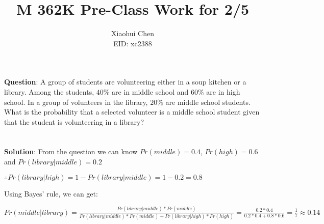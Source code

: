 \documentclass[12pt]{article}
\author{Xiaohui Chen \\EID: xc2388}
\title{M 362K Pre-Class Work for 2/5}
\begin{document}
\maketitle
\begin{spacing}{2.0}

\textbf{Question}: A group of students are volunteering either in a soup kitchen or a library. Among the students, $40\%$ are in middle school and $60\%$ are in high school. In a group of volunteers in the library, $20\%$ are middle school students. What is the probability that a selected volunteer is a middle school student given that the student is volunteering in a library?\\
\\
\\

\textbf{Solution}:
From the question we can know $Pr(middle)=0.4$, $Pr(high)=0.6$ and $Pr(library|middle)=0.2$

$\therefore Pr(library|high)=1-Pr(library|middle)=1-0.2=0.8$

Using Bayes' rule, we can get:

$Pr(middle|library)=\frac{Pr(library|middle)*Pr(middle)}{ Pr(library|middle)*Pr(middle)+Pr(library|high)*Pr(high)}= \frac{0.2*0.4}{0.2*0.4+ 0.8*0.6}= \frac{1}{7} \approx 0.14$


\end{spacing}
\end{document}

